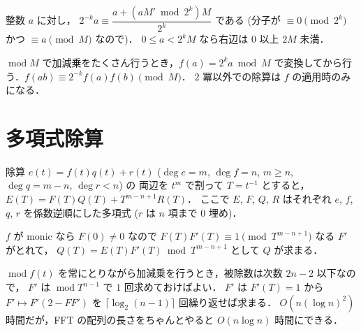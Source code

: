 \documentclass{jsarticle}
\DeclareMathOperator{\Mod}{mod}
\begin{document}
整数 $a$ に対し，
$2^{-k} a \equiv \dfrac{a + (a M' \bmod 2^k) M}{2^k}$ である (分子が $\equiv 0 \pmod{2^k}$ かつ $\equiv a \pmod{M}$ なので)．
$0 \le a < 2^k M$ なら右辺は $0$ 以上 $2 M$ 未満．

$\Mod M$ で加減乗をたくさん行うとき，$f(a) = 2^k a \bmod M$ で変換してから行う．$f(a b) \equiv 2^{-k} f(a) f(b) \pmod{M}$．
$2$ 冪以外での除算は $f$ の適用時のみになる．


\section{多項式除算}
除算 $e(t) = f(t) q(t) + r(t)$ ($\deg e = m$, $\deg f = n$, $m \ge n$, $\deg q = m - n$, $\deg r < n$) の
両辺を $t^m$ で割って $T = t^{-1}$ とすると，
$E(T) = F(T) Q(T) + T^{m-n+1} R(T)$．
ここで $E$, $F$, $Q$, $R$ はそれぞれ $e$, $f$, $q$, $r$ を係数逆順にした多項式 ($r$ は $n$ 項まで $0$ 埋め)．

$f$ が monic なら $F(0) \ne 0$ なので $F(T) F'(T) \equiv 1 \pmod{T^{m-n+1}}$ なる $F'$ がとれて，
$Q(T) = E(T) F'(T) \bmod T^{m-n+1}$ として $Q$ が求まる．

$\Mod f(t)$ を常にとりながら加減乗を行うとき，被除数は次数 $2 n - 2$ 以下なので，
$F'$ は $\Mod T^{n-1}$ で $1$ 回求めておけばよい．
$F'$ は $F'(T) = 1$ から $F' \mapsto F' (2 - F F')$ を $\lceil \log_2 (n - 1) \rceil$ 回繰り返せば求まる．
$O(n (\log n)^2)$ 時間だが，FFT の配列の長さをちゃんとやると $O(n \log n)$ 時間にできる．
\end{document}
